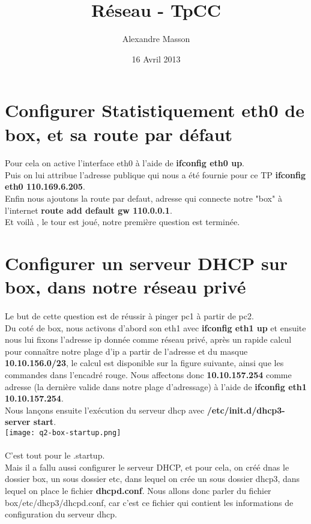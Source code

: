 \documentclass{article}
\title{Réseau - TpCC}
\author{Alexandre Masson}
\date{16 Avril 2013}
\begin{document}
\maketitle
\newpage

\section{Configurer Statistiquement eth0 de box, et sa route par défaut}
\paragraph{}
Pour cela on active l'interface eth0 à l'aide de \textbf{ifconfig eth0 up}.\\ Puis on lui attribue l'adresse publique qui nous a été fournie pour ce TP \textbf{ifconfig eth0 110.169.6.205}. \\Enfin nous ajoutons la route par defaut, adresse qui connecte notre "box" à l'internet \textbf{route add default gw 110.0.0.1}. \\Et voilà , le tour est joué, notre première question est terminée.

\section{Configurer un serveur DHCP sur box, dans notre réseau privé}
\paragraph{}
Le but de cette question est de réussir à pinger pc1 à partir de pc2.\\
Du coté de box, nous activons d'abord son eth1 avec \textbf{ifconfig eth1 up} et ensuite nous lui fixons l'adresse ip donnée comme réseau privé, après un rapide calcul pour connaître notre plage d'ip a partir de l'adresse et du masque \textbf{10.10.156.0/23}, le calcul est disponible sur la figure suivante, ainsi que les commandes dans l'encadré rouge. Nous affectons donc \textbf{10.10.157.254} comme adresse (la dernière valide dans notre plage d'adressage) à l'aide de \textbf{ifconfig eth1 10.10.157.254}.\\ Nous lançons ensuite l'exécution du serveur dhcp avec \textbf{/etc/init.d/dhcp3-server start}. \\

\texttt{[image: q2-box-startup.png]}\\\\

C'est tout pour le .startup.\\
Mais il a fallu aussi configurer le serveur DHCP, et pour cela, on créé dnas le dossier box, un sous dossier etc, dans lequel on crée un sous dossier dhcp3, dans lequel on place le fichier \textbf{dhcpd.conf}. Nous allons donc parler du fichier box/etc/dhcp3/dhcpd.conf, car c'est ce fichier qui contient les informations de configuration du serveur dhcp.
\newpage
\end{document}
